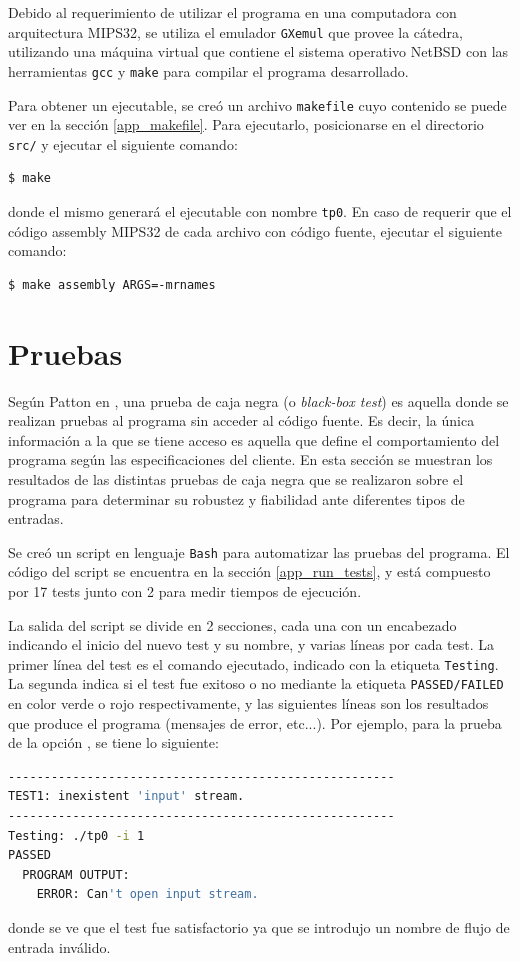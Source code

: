 Debido al requerimiento de utilizar el programa en una computadora con arquitectura MIPS32, se utiliza el emulador \texttt{GXemul} que provee la cátedra, utilizando una máquina virtual que contiene el sistema operativo NetBSD con las herramientas \texttt{gcc} y \texttt{make} para compilar el programa desarrollado.

Para obtener un ejecutable, se creó un archivo \texttt{makefile} cuyo contenido se puede ver en la sección \ref{app_makefile}. Para ejecutarlo, posicionarse en el directorio \texttt{src/} y ejecutar el siguiente comando:
\begin{lstlisting}[language=bash, style=StyleC]
    $ make
\end{lstlisting}

donde el mismo generará el ejecutable con nombre \texttt{tp0}. En caso de requerir que el código assembly MIPS32 de cada archivo con código fuente, ejecutar el siguiente comando:
\begin{lstlisting}[language=bash, style=StyleC]
    $ make assembly ARGS=-mrnames
\end{lstlisting}

\clearpage
\section{Pruebas}

Según Patton en \cite{book_patton}, una prueba de caja negra (o \emph{black-box test}) es aquella donde se realizan pruebas al programa sin acceder al código fuente. Es decir, la única información a la que se tiene acceso es aquella que define el comportamiento del programa según las especificaciones del cliente. En esta sección se muestran los resultados de las distintas pruebas de caja negra que se realizaron sobre el programa para determinar su robustez y fiabilidad ante diferentes tipos de entradas. 

Se creó un script en lenguaje \texttt{Bash} para automatizar las pruebas del programa.  El código del script se encuentra en la sección \ref{app_run_tests}, y está compuesto por 17 tests junto con 2 para medir tiempos de ejecución.

La salida del script se divide en 2 secciones, cada una con un encabezado indicando el inicio del nuevo test y su nombre, y varias líneas por cada test. La primer línea del test es el comando ejecutado, indicado con la etiqueta \texttt{Testing}. La segunda indica si el test fue exitoso o no mediante la etiqueta \texttt{PASSED/FAILED} en color verde o rojo respectivamente, y las siguientes líneas son los resultados que produce el programa (mensajes de error, etc...). Por ejemplo, para la prueba de la opción , se tiene lo siguiente:
\begin{lstlisting}[language=bash, style=StyleC]
------------------------------------------------------
TEST1: inexistent 'input' stream.
------------------------------------------------------
Testing: ./tp0 -i 1
PASSED 
  PROGRAM OUTPUT:
	ERROR: Can't open input stream.
\end{lstlisting}
donde se ve que el test fue satisfactorio ya que se introdujo un nombre de flujo de entrada inválido.

